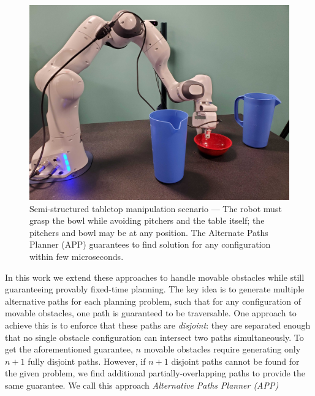 \documentclass[a4paper]{report}
\begin{document}
\begin{figure}[bt]
\centering
 \includegraphics[width=\columnwidth]{figs/cover.jpg}
\caption{Semi-structured tabletop manipulation scenario --- The robot must grasp the bowl while avoiding pitchers and the table itself; the pitchers and bowl may be at any position. The Alternate Paths Planner (APP) guarantees to find solution for any configuration within few microseconds.}
\label{fig:cover}
\vskip -0.5cm
\end{figure}

In this work we extend these approaches to handle movable obstacles while still guaranteeing provably fixed-time planning.
The key idea is to generate multiple alternative paths for each planning problem, such that for any configuration of movable obstacles, one path is guaranteed to be traversable.
One approach to achieve this is to enforce %
that these paths are \emph{disjoint}: they are separated enough that no single obstacle configuration can intersect two paths simultaneously.
To get the aforementioned guarantee, $n$ movable obstacles require generating only $n+1$ fully disjoint paths.
However, if $n+1$ disjoint paths cannot be found for the given problem, we find additional partially-overlapping paths to provide the same guarantee.
We call this approach \emph{Alternative Paths Planner (APP)}
\end{document}

